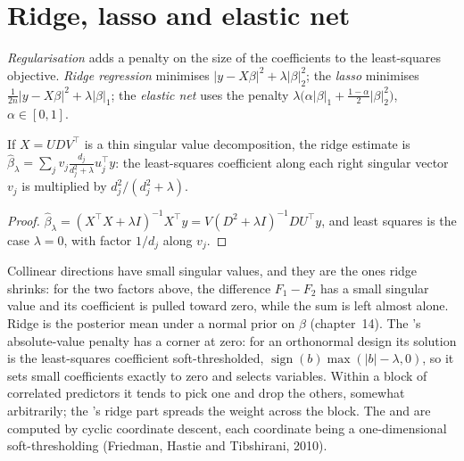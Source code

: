 \section{Ridge, lasso and elastic net}

\begin{definition}\label{def:qm:linear-models-under-stress:penalties}
\emph{Regularisation} adds a penalty on the size of the coefficients to the least-squares objective. \emph{Ridge
regression} minimises $\lvert y - X\beta\rvert^2 + \lambda\lvert\beta\rvert_2^2$; the \emph{lasso} minimises
$\frac1{2n}\lvert y - X\beta\rvert^2 + \lambda\lvert\beta\rvert_1$; the \emph{elastic net} uses the penalty $\lambda\bigl(\alpha\lvert\beta\rvert_1
+ \frac{1 - \alpha}2\lvert\beta\rvert_2^2\bigr)$, $\alpha \in [0, 1]$.
\end{definition}

\begin{proposition}\label{prop:qm:linear-models-under-stress:ridge}
If $X = UDV^\top$ is a thin singular value decomposition, the ridge estimate is $\hat\beta_\lambda = \sum_jv_j\frac{d_j}{d_j^2 + \lambda}u_j^\top y$:
the least-squares coefficient along each right singular vector $v_j$ is multiplied by $d_j^2/(d_j^2 + \lambda)$.
\end{proposition}

\begin{proof}
$\hat\beta_\lambda = (X^\top X + \lambda I)^{-1}X^\top y = V(D^2 + \lambda I)^{-1}DU^\top y$, and least squares is the case $\lambda = 0$, with factor
$1/d_j$ along $v_j$.
\end{proof}

Collinear directions have small singular values, and they are the ones ridge shrinks: for the two factors above, the difference $F_1 - F_2$ has
a small singular value and its coefficient is pulled toward zero, while the sum is left almost alone. Ridge is the posterior mean under a normal
prior on $\beta$ (chapter~14). The 's absolute-value penalty has a corner at zero: for an orthonormal design its solution is the
least-squares coefficient soft-thresholded, $\operatorname{sign}(b)\max(|b| - \lambda, 0)$, so it sets small coefficients exactly to zero and
selects variables. Within a block of correlated predictors it tends to pick one and drop the others, somewhat arbitrarily; the 's
ridge part spreads the weight across the block. The  and  are computed by cyclic coordinate descent, each coordinate being a
one-dimensional soft-thresholding (Friedman, Hastie and Tibshirani, 2010).

